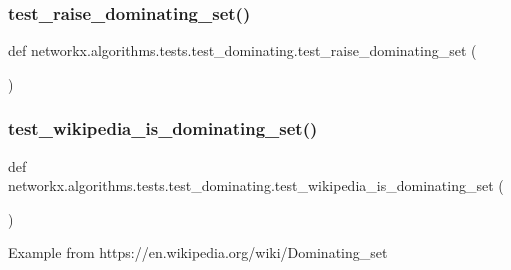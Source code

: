 \subsubsection{\texorpdfstring{test\+\_\+raise\+\_\+dominating\+\_\+set()}{test\_raise\_dominating\_set()}}
{\footnotesize\ttfamily def networkx.\+algorithms.\+tests.\+test\+\_\+dominating.\+test\+\_\+raise\+\_\+dominating\+\_\+set (\begin{DoxyParamCaption}{ }\end{DoxyParamCaption})}

\mbox{\label{namespacenetworkx_1_1algorithms_1_1tests_1_1test__dominating_a76f967b692bc17989b832a5759585b69}} 
\subsubsection{\texorpdfstring{test\+\_\+wikipedia\+\_\+is\+\_\+dominating\+\_\+set()}{test\_wikipedia\_is\_dominating\_set()}}
{\footnotesize\ttfamily def networkx.\+algorithms.\+tests.\+test\+\_\+dominating.\+test\+\_\+wikipedia\+\_\+is\+\_\+dominating\+\_\+set (\begin{DoxyParamCaption}{ }\end{DoxyParamCaption})}

\begin{DoxyVerb}Example from https://en.wikipedia.org/wiki/Dominating_set\end{DoxyVerb}
 